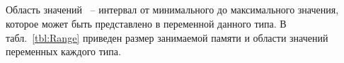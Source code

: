 \begin{comment}
Типы данных, определяемые пользователем, указаны в табл.~\ref{tbl:UserDataTypes}.

\begin{MyTableTwoColCntr}{Типы данных пользователя}{tbl:UserDataTypes}{|m{0.17\linewidth}|m{0.73\linewidth}|}{Тип данных}{Описание}
\hline Массивы  & Одномерный:\textcolor{white}{отс}  имя\_массива[размер] \newline Двумерный:\textcolor{white}{отсту}   имя\_массива[размер][размер]\\
\hline Структуры & struct имя\_структуры \{описание элемента структуры, ... \};  \newline
Поля бит в структурах: \textcolor{white}{отс} struct имя\_структуры \{ \newline
описание элемента структуры : кол-во бит, ... \};\\
\hline  Объединения  & union имя\_объединения \{описание элемента объединения, ... \}; \\
\hline  Перечисления & enum имя\_перечисления \{список значений \}; \\
\end{MyTableTwoColCntr}
\end{comment}


\subsection{}

Область значений ~-- интервал от минимального до максимального значения, которое может быть представлено в переменной данного типа. В табл.~\ref{tbl:Range} приведен размер занимаемой памяти и области значений переменных каждого типа. \killoverfullbefore
 
